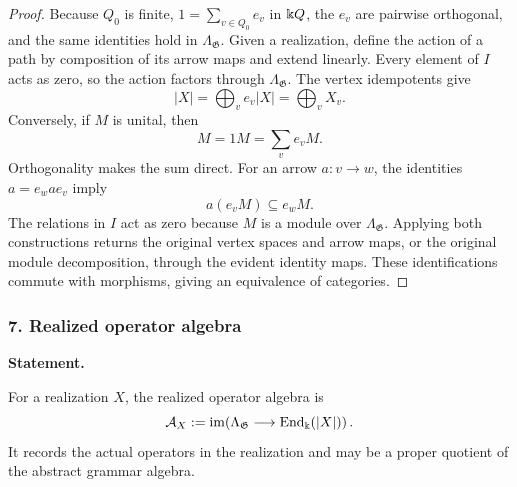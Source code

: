 \begin{proof}
Because $Q_0$ is finite, $1=\sum_{v\in Q_0}e_v$ in $\Bbbk Q$, the $e_v$ are pairwise orthogonal, and the same identities hold in $\Lambda_{\mathfrak G}$.  Given a realization, define the action of a path by composition of its arrow maps and extend linearly.  Every element of $I$ acts as zero, so the action factors through $\Lambda_{\mathfrak G}$.  The vertex idempotents give
\[
|X|=\bigoplus_v e_v|X|=\bigoplus_vX_v.
\]
Conversely, if $M$ is unital, then
\[
M=1M=\sum_ve_vM.
\]
Orthogonality makes the sum direct.  For an arrow $a:v\to w$, the identities $a=e_wae_v$ imply
\[
a(e_vM)\subseteq e_wM.
\]
The relations in $I$ act as zero because $M$ is a module over $\Lambda_{\mathfrak G}$.  Applying both constructions returns the original vertex spaces and arrow maps, or the original module decomposition, through the evident identity maps.  These identifications commute with morphisms, giving an equivalence of categories.
\end{proof}
\subsubsection*{7. Realized operator algebra}
\label{rec:PSC-I-D-REALIZED-ALGEBRA}
\textbf{Statement.}\par
For a realization $X$, the realized operator algebra is
\[
\mathcal A_X:=\operatorname{im}\!\left(\Lambda_{\mathfrak G}\longrightarrow\operatorname{End}_{\Bbbk}(|X|)\right).
\]
It records the actual operators in the realization and may be a proper quotient of the abstract grammar algebra.
